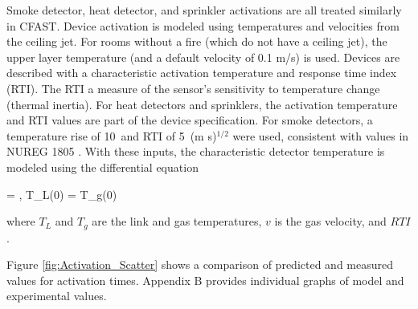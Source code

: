 Smoke detector, heat detector, and sprinkler activations are all treated similarly in CFAST.  Device activation is modeled using temperatures and velocities from the ceiling jet.  For rooms without a fire (which do not have a ceiling jet), the upper layer temperature (and a default velocity of 0.1 m/s) is used.  Devices are described with a characteristic activation temperature and response time index (RTI). The RTI a measure of the sensor's sensitivity to temperature change (thermal inertia). For heat detectors and sprinklers, the activation temperature and RTI values are part of the device specification. For smoke detectors, a temperature rise of 10~\degc and RTI of 5~(m s)$^{1/2}$ were used, consistent with values in NUREG 1805 \cite{NRCNUREG1805}. With these inputs, the characteristic detector temperature is modeled using the differential equation \cite{Heskestad:1976}

\be {} =   \; , \; T_L(0) = T_g(0)  \ee

where $T_L$ and $T_g$ are the link and gas temperatures, $v$ is the gas velocity, and $RTI$.

Figure \ref{fig:Activation_Scatter} shows a comparison of predicted and measured values for activation times. Appendix B provides individual graphs of model and experimental values.

